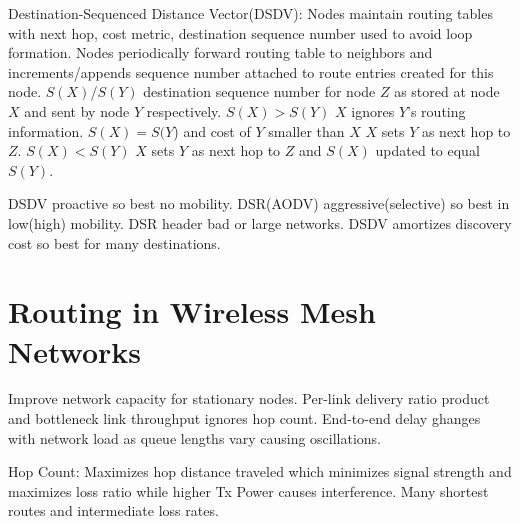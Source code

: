 \documentclass[9pt]{extarticle}
\begin{document}
\begin{multicols}{2}
Destination-Sequenced Distance Vector(DSDV): Nodes maintain routing tables with next hop, cost metric, destination sequence number used to avoid loop formation. Nodes periodically forward routing table to neighbors and increments/appends sequence number attached to route entries created for this node. $S(X)$/$S(Y)$ destination sequence number for node $Z$ as stored at node $X$ and sent by node $Y$ respectively. $S(X)>S(Y)$ $X$ ignores $Y$'s routing information. $S(X)=S(Y$) and cost of $Y$ smaller than $X$ $X$ sets $Y$ as next hop to $Z$. $S(X)<S(Y)$ $X$ sets $Y$ as next hop to $Z$ and $S(X)$ updated to equal $S(Y)$.

DSDV proactive so best no mobility. DSR(AODV) aggressive(selective) so best in low(high) mobility. DSR header bad or large networks. DSDV amortizes discovery cost so best for many destinations.

\section{Routing in Wireless Mesh Networks}

Improve network capacity for stationary nodes. Per-link delivery ratio product and bottleneck link throughput ignores hop count. End-to-end delay ghanges with network load as queue lengths vary causing oscillations.

Hop Count: Maximizes hop distance traveled which minimizes signal strength and maximizes loss ratio while higher Tx Power causes interference. Many shortest routes and intermediate loss rates.


\end{multicols}
\end{document}
